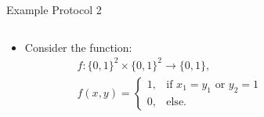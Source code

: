 \documentclass{beamer}
\begin{document}
\begin{frame}[t]{Example Protocol 2}
\begin{columns}[T]
\begin{column}{.65\textwidth}   
\begin{itemize}
    \item Consider the function: 
        \begin{align*}
            &f: \{0, 1\}^2 \times \{0, 1\}^2 \to \{0, 1\},\\
            &f(x, y) = \left\lbrace
                \begin{array}{cl}
                1, & \text{if } x_1 = y_1 \text{ or } y_2 = 1\\ 
                0, & \text{else.}
                \end{array} 
            \right.
        \end{align*}
\end{itemize}
\end{column}
\begin{column}{.3\textwidth}
{}
\end{column}
\end{columns}
\end{frame}
\end{document}

